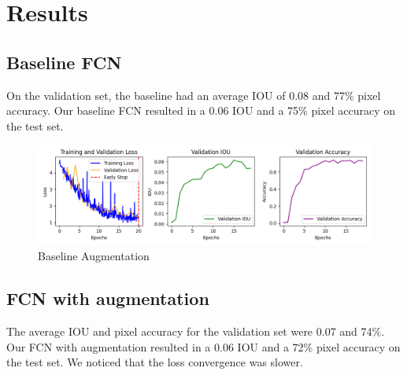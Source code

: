 \section*{Results}


\subsection*{Baseline FCN}

On the validation set, the baseline had an average IOU of 0.08 and 77\% pixel accuracy. Our baseline FCN resulted in a 0.06 IOU and a 75\% pixel accuracy on the test set.

\begin{figure}[H]
	\centering
	\includegraphics[width=\textwidth]{plots/baseline}
	\caption{Baseline Augmentation}
	\label{fig:baseline}
\end{figure}

\subsection*{FCN with augmentation}

The average IOU and pixel accuracy for the validation set were 0.07 and 74\%. Our FCN with augmentation resulted in a 0.06 IOU and a 72\% pixel accuracy on the test set. We noticed that the loss convergence
was slower.

